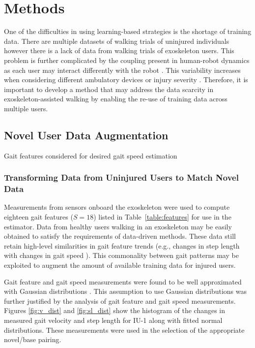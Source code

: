 \section{Methods}
One of the difficulties in using learning-based strategies is the shortage of training data. There are multiple datasets of walking trials of uninjured individuals \cite{hu2018benchmark,anguita2013public,fukuchi2018public} however there is a lack of data from walking trials of exoskeleton users. This problem is further complicated by the coupling present in human-robot dynamics as each user may interact differently with the robot \cite{sylla2014assessing}. This variability increases when considering different ambulatory devices \cite{gambon2019characterizing} or injury severity \cite{gambon2020effects, rota2011walk}. Therefore, it is important to develop a method that may address the data scarcity in exoskeleton-assisted walking by enabling the re-use of training data across multiple users.

\subsection{Novel User Data Augmentation}
\begin{table}
	\footnotesize
	\centering
	\caption{Gait features considered for desired gait speed estimation }\label{table:features}
	
\end{table}

\subsubsection{Transforming Data from Uninjured Users to Match Novel Data}
Measurements from sensors onboard the exoskeleton were used to compute eighteen gait features ($S=18$) listed in Table~\ref{table:features} for use in the estimator. Data from healthy users walking in an exoskeleton may be easily obtained to satisfy the requirements of data-driven methods. These data still retain high-level similarities in gait feature trends (e.g., changes in step length with changes in gait speed \cite{karulkar2021using}). This commonality between gait patterns may be exploited to augment the amount of available training data for injured users.

Gait feature and gait speed measurements were found to be well approximated with Gaussian distributions \cite{austin2011disambiguation}. This assumption to use Gaussian distributions was further justified by the analysis of gait feature and gait speed measurements. Figures \ref{fig:v_dist} and \ref{fig:sl_dist} show the histogram of the changes in measured gait velocity and step length for IU-1 along with fitted normal distributions. These measurements were used in the selection of the appropriate novel/base pairing. 

